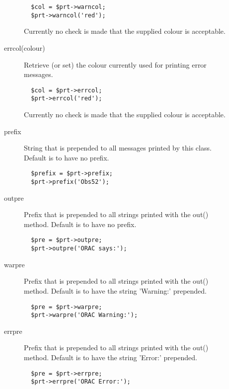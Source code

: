 \begin{description}
\begin{description}
\begin{verbatim}
  $col = $prt->warncol;
  $prt->warncol('red');
\end{verbatim}


Currently no check is made that the supplied colour is acceptable.


\item[{errcol(colour)}] \mbox{}

Retrieve (or set) the colour currently used for printing error
messages.

\begin{verbatim}
  $col = $prt->errcol;
  $prt->errcol('red');
\end{verbatim}


Currently no check is made that the supplied colour is acceptable.


\item[{prefix}] \mbox{}

String that is prepended to all messages printed by this class.
Default is to have no prefix.

\begin{verbatim}
  $prefix = $prt->prefix;
  $prt->prefix('Obs52');
\end{verbatim}

\item[{outpre}] \mbox{}

Prefix that is prepended to all strings printed with the
out() method. Default is to have no prefix.

\begin{verbatim}
  $pre = $prt->outpre;
  $prt->outpre('ORAC says:');
\end{verbatim}

\item[{warpre}] \mbox{}

Prefix that is prepended to all strings printed with the
out() method. Default is to have the string 'Warning:' prepended.

\begin{verbatim}
  $pre = $prt->warpre;
  $prt->warpre('ORAC Warning:');
\end{verbatim}

\item[{errpre}] \mbox{}

Prefix that is prepended to all strings printed with the
out() method. Default is to have the string 'Error:' prepended.

\begin{verbatim}
  $pre = $prt->errpre;
  $prt->errpre('ORAC Error:');
\end{verbatim}


\end{description}
\end{description}

